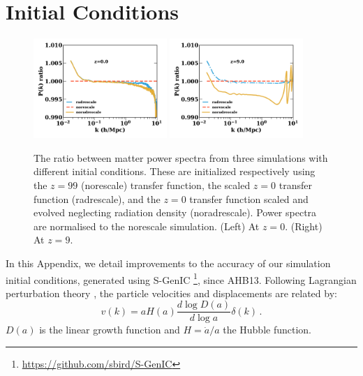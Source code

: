 \documentclass[useAMS, usenatbib]{mnras}
\begin{document}
\section{Initial Conditions}
\label{sec:initcond}

\begin{figure}
\includegraphics[width=0.45\textwidth]{icplots/pks_rel-1.pdf}
\includegraphics[width=0.45\textwidth]{icplots/pks_rel-0_1.pdf}
  \caption{The ratio between matter power spectra from three simulations with different initial conditions.
  These are initialized respectively using the $z=99$ (norescale) transfer function,
  the scaled $z=0$ transfer function (radrescale), and the $z=0$ transfer function
  scaled and evolved neglecting radiation density (noradrescale). Power spectra are normalised to the norescale simulation.
  (Left) At $z=0$. (Right) At $z=9$.}
  \label{fig:rescaling}
\end{figure}

In this Appendix, we detail improvements to the accuracy of our simulation initial conditions, generated using S-GenIC \footnote{\url{https://github.com/sbird/S-GenIC}}, since AHB13.
Following Lagrangian perturbation theory \citep{Zeldovich_1970, Scoccimarro_1998},
the particle velocities and displacements are related by:
\begin{equation}
v(k) = a H(a) \frac{d \log D(a)}{d \log a} \delta(k)\,.
\label{eq:vel_prefac}
\end{equation}
$D(a)$ is the linear growth function and $H = \dot{a}/a$ the Hubble function.
\end{document}
